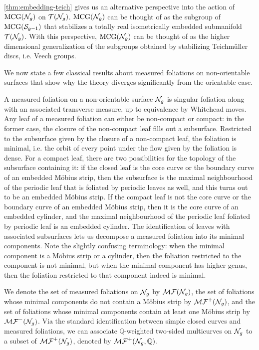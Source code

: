\documentclass[12pt, reqno]{amsart}
\begin{document}
\autoref{thm:embedding-teich} gives us an alternative perspective into the action of $\mathrm{MCG}(\mathcal{N}_g)$ on $\mathcal{T}(\mathcal{N}_g)$.
$\mathrm{MCG}(\mathcal{N}_g)$ can be thought of as the subgroup of $\mathrm{MCG}(\mathcal{S}_{g-1})$ that stabilizes a totally real isometrically embedded submanifold $\mathcal{T}(\mathcal{N}_g)$.
With this perspective, $\mathrm{MCG}(\mathcal{N}_g)$ can be thought of as the higher dimensional generalization of the subgroups obtained by stabilizing Teichmüller discs, i.e. Veech groups.

We now state a few classical results about measured foliations on non-orientable surfaces that show why the theory diverges significantly from the orientable case.

A measured foliation on a non-orientable surface $\mathcal{N}_g$ is singular foliation along with an associated transverse measure, up to equivalence by Whitehead moves.
Any leaf of a measured foliation can either be non-compact or compact: in the former case, the closure of the non-compact leaf fills out a subsurface.
Restricted to the subsurface given by the closure of a non-compact leaf, the foliation is minimal, i.e. the orbit of every point under the flow given by the foliation is dense.
For a compact leaf, there are two possibilities for the topology of the subsurface containing it: if the closed leaf is the core curve or the boundary curve of an embedded M\"obius strip, then the subsurface is the maximal neighbourhood of the periodic leaf that is foliated by periodic leaves as well, and this turns out to be an embedded M\"obius strip.
If the compact leaf is not the core curve or the boundary curve of an embedded M\"obius strip, then it is the core curve of an embedded cylinder, and the maximal neighbourhood of the periodic leaf foliated by periodic leaf is an embedded cylinder.
The identification of leaves with associated subsurfaces lets us decompose a measured foliation into its minimal components.
Note the slightly confusing terminology: when the minimal component is a M\"obius strip or a cylinder, then the foliation restricted to the component is not minimal, but when the minimal component has higher genus, then the foliation restricted to that component indeed is minimal.

We denote the set of measured foliations on $\mathcal{N}_g$ by $\mathcal{MF}(\mathcal{N}_g)$, the set of foliations whose minimal components do not contain a M\"obius strip by $\mathcal{MF}^+(\mathcal{N}_g)$, and the set of foliations whose minimal components contain at least one M\"obius strip by $\mathcal{MF}^-(\mathcal{N}_g)$.
Via the standard identification between simple closed curves and measured foliations, we can associate $\mathbb{Q}$-weighted two-sided multicurves on $\mathcal{N}_g$ to a subset of $\mathcal{MF}^+(\mathcal{N}_g)$, denoted by $\mathcal{MF}^+(\mathcal{N}_g, \mathbb{Q})$.
\end{document}
